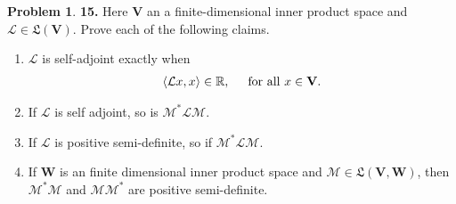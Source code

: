 \documentclass{article}
\theoremstyle{definition}
\newtheorem*{prob*}{Problem}
\newcommand{\R}{\mathbb{R}}
\newcommand{\V}{\mathbf{V}}
\newcommand{\W}{\mathbf{W}}
\newcommand{\lag}{\mathcal{L}}
\newcommand{\M}{\mathcal{M}}
\newcommand{\LL}{\mathfrak{L}}
\newcommand{\la}{\langle}
\newcommand{\ra}{\rangle}
\begin{document}
\newpage
































\begin{prob*}\textbf{15.} Here $\V$ an a finite-dimensional inner product space and $\lag \in \LL(\V)$. Prove each of the following claims.
	\begin{enumerate}
		\item $\lag$ is self-adjoint exactly when
		\begin{align*}
		\la \lag x,x \ra \in \R, \hspace{0.5cm} \text{for all $x \in \V$}.
		\end{align*}
		
		\item If $\lag$ is self adjoint, so is $\M^* \lag \M$.
		
		\item If $\lag$ is positive semi-definite, so if $\M^* \lag \M$.
		
		
		\item If $\W$ is an finite dimensional inner product space and $\M \in \LL(\V,\W)$, then $\M^*\M$ and $\M\M^*$ are positive semi-definite. 
	\end{enumerate}
	
\end{prob*}






\newpage
\end{document}
